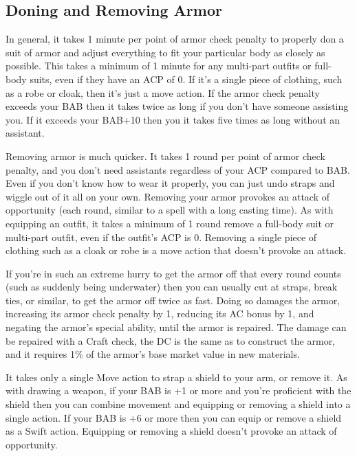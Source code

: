 \subsection{Doning and Removing Armor}

In general, it takes 1 minute per point of armor check penalty to properly don a suit of armor and adjust everything to fit your particular body as closely as possible. This takes a minimum of 1 minute for any multi-part outfits or full-body suits, even if they have an ACP of 0. If it's a single piece of clothing, such as a robe or cloak, then it's just a move action. If the armor check penalty exceeds your BAB then it takes twice as long if you don't have someone assisting you. If it exceeds your BAB+10 then you it takes five times as long without an assistant.

Removing armor is much quicker. It takes 1 round per point of armor check penalty, and you don't need assistants regardless of your ACP compared to BAB. Even if you don't know how to wear it properly, you can just undo straps and wiggle out of it all on your own. Removing your armor provokes an attack of opportunity (each round, similar to a spell with a long casting time). As with equipping an outfit, it takes a minimum of 1 round remove a full-body suit or multi-part outfit, even if the outfit's ACP is 0. Removing a single piece of clothing such as a cloak or robe is a move action that doesn't provoke an attack.

If you're in such an extreme hurry to get the armor off that every round counts (such as suddenly being underwater) then you can usually cut at straps, break ties, or similar, to get the armor off twice as fast. Doing so damages the armor, increasing its armor check penalty by 1, reducing its AC bonus by 1, and negating the armor's special ability, until the armor is repaired. The damage can be repaired with a Craft check, the DC is the same as to construct the armor, and it requires 1\% of the armor's base market value in new materials.

It takes only a single Move action to strap a shield to your arm, or remove it. As with drawing a weapon, if your BAB is +1 or more and you're proficient with the shield then you can combine movement and equipping or removing a shield into a single action. If your BAB is +6 or more then you can equip or remove a shield as a Swift action. Equipping or removing a shield doesn't provoke an attack of opportunity.

